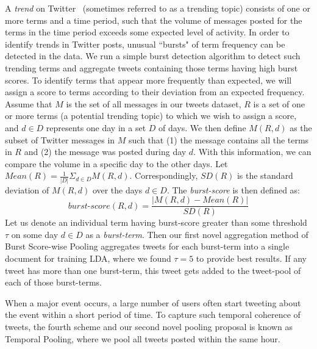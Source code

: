 \documentclass{sig-alternate}
\begin{document}
\vspace{1mm} A \textit{trend} on
Twitter~\cite{mor} (sometimes referred to as a trending topic)
consists of one or more terms and a time period, such that the volume
of messages posted for the terms in the time period exceeds some
expected level of activity.  In order to identify trends in Twitter
posts, unusual ``bursts" of term frequency can be detected in the data.
We run a simple burst detection algorithm to detect such trending
terms and aggregate tweets containing those terms having high burst
scores.  To identify terms that appear more frequently than expected,
we will assign a score to terms according to their deviation from an
expected frequency. Assume that $M$ is the set of all messages in our
tweets dataset, $R$ is a set of one or more terms (a potential
trending topic) to which we wish to assign a score, and $d \in D$
represents one day in a set $D$ of days.  We then define $M(R, d)$ as
the subset of Twitter messages in $M$ such that (1) the message
contains all the terms in $R$ and (2) the message was posted during
day $d$.  With this information, we can compare the volume in a
specific day to the other days.  Let $\mathit{Mean}(R) = \frac{1}{|D|}
\Sigma_{d \in D} M(R,d)$.  Correspondingly, $\mathit{SD}(R)$ is the
standard deviation of $M(R,d)$ over the days $d \in D$.  The
\textit{burst-score} is then defined as:
\[
\mathit{burst\textrm{-}score}(R,d) = \frac{|M(R,d) - \mathit{Mean}(R)|}{\mathit{SD}(R)} 
\]
Let us denote an individual term having burst-score greater than some
threshold $\tau$ on some day $d \in D$ as a \textit{burst-term}.  Then
our first novel aggregation method of Burst Score-wise Pooling
aggregates tweets for each burst-term into a single document for
training LDA, where we found $\tau = 5$ to provide best results. If any tweet has more than one burst-term, this tweet gets added to the tweet-pool of each of those burst-terms.

\vspace{1mm} When a major event occurs, a
large number of users often start tweeting about the event within a
short period of time.  To capture such temporal coherence of tweets,
the fourth scheme and our second novel pooling proposal is known as
Temporal Pooling, where we pool all tweets posted within the same
hour.
\end{document}
